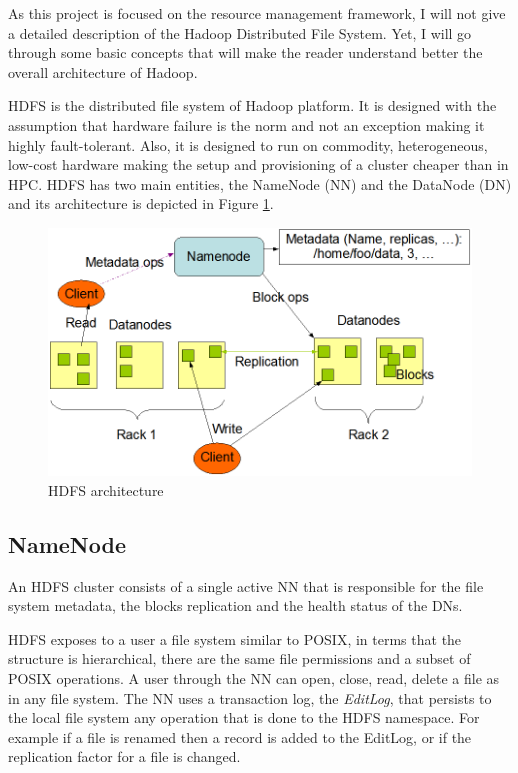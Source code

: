 As this project is focused on the resource management framework, I will
not give a detailed description of the Hadoop Distributed File
System. Yet, I will go through some basic concepts that will make the
reader understand better the overall architecture of Hadoop.

HDFS is the distributed file system of Hadoop platform. It is designed
with the assumption that hardware failure is the norm and not an
exception making it highly fault-tolerant. Also, it is designed to run
on commodity, heterogeneous, low-cost hardware making the setup and provisioning of
a cluster cheaper than in HPC. HDFS has two main entities, the NameNode
(NN) and the DataNode (DN) and its architecture is depicted in Figure
\ref{fig:hadoop_hdfs}.

\begin{figure}
\centering
\includegraphics[scale=0.5]{resources/images/Background/hdfs_arch.png}
\caption{HDFS architecture \cite{hdfs}}
\label{fig:hadoop_hdfs}
\end{figure}

\subsection{NameNode}
\label{ssec:nn}

An HDFS cluster consists of a single active NN that is responsible for the
file system metadata, the blocks replication and the health
status of the DNs.

HDFS exposes to a user a file system similar to POSIX, in terms that
the structure is hierarchical, there are the same file permissions 
and a subset of POSIX operations. A user through the NN can open,
close, read, delete a file as in any file system. The NN uses a transaction
log, the \emph{EditLog}, that persists to the local file system any
operation that is done to the HDFS namespace. For example if a file is
renamed then a record is added to the EditLog, or if the replication
factor for a file is changed.

